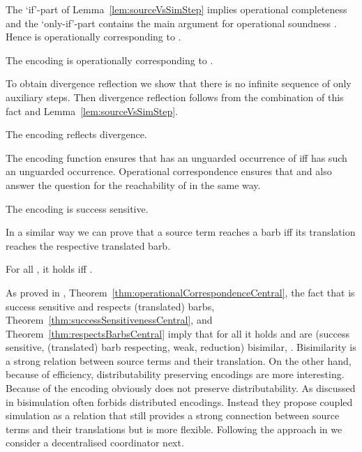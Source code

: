 \documentclass[copyright,creativecommons]{eptcs}
\begin{document}
\noindent
The `if'-part of Lemma~\ref{lem:sourceVsSimStep} implies operational completeness \wrt  and the `only-if'-part contains the main argument for operational soundness \wrt . Hence  is operationally corresponding \wrt to .

\begin{theorem}
	The encoding  is operationally corresponding \wrt to .
	\label{thm:operationalCorrespondenceCentral}
\end{theorem}

To obtain divergence reflection we show that there is no infinite sequence of only auxiliary steps.
Then divergence reflection follows from the combination of this fact and Lemma~\ref{lem:sourceVsSimStep}.

\begin{theorem}
	The encoding  reflects divergence.
	\label{thm:divergenceReflectionCentral}
\end{theorem}

The encoding function ensures that  has an unguarded occurrence of  iff  has such an unguarded occurrence. Operational correspondence ensures that  and  also answer the question for the reachability of  in the same way.

\begin{theorem}
	The encoding  is success sensitive.
	\label{thm:successSensitivenessCentral}
\end{theorem}

In a similar way we can prove that a source term reaches a barb iff its translation reaches the respective translated barb.

\begin{theorem}
	For all , it holds  iff .
	\label{thm:respectsBarbsCentral}
\end{theorem}

As proved in \cite{petersGlabbeek15}, Theorem~\ref{thm:operationalCorrespondenceCentral}, the fact that  is success sensitive and respects (translated) barbs, Theorem~\ref{thm:successSensitivenessCentral}, and Theorem~\ref{thm:respectsBarbsCentral} imply that for all  it holds  and  are (success sensitive, (translated) barb respecting, weak, reduction) bisimilar, \ie .
Bisimilarity is a strong relation between source terms and their translation. On the other hand, because of efficiency, distributability preserving encodings are more interesting.
Because of  the encoding  obviously does not preserve distributability. As discussed in \cite{parrowCoupled92} bisimulation often forbids distributed encodings. Instead they propose coupled simulation as a relation that still provides a strong connection between source terms and their translations but is more flexible. Following the approach in \cite{parrowCoupled92} we consider a decentralised coordinator next.
\end{document}
